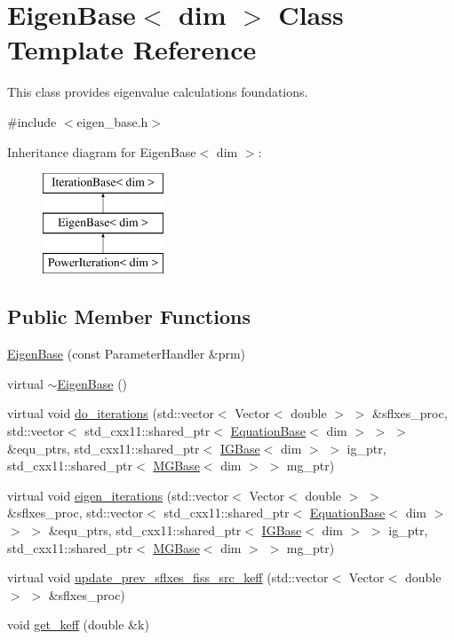 \hypertarget{class_eigen_base}{}\section{Eigen\+Base$<$ dim $>$ Class Template Reference}
\label{class_eigen_base}


This class provides eigenvalue calculations foundations.  




{\ttfamily \#include $<$eigen\+\_\+base.\+h$>$}

Inheritance diagram for Eigen\+Base$<$ dim $>$\+:\begin{figure}[H]
\begin{center}
\leavevmode
\includegraphics[height=3.000000cm]{class_eigen_base}
\end{center}
\end{figure}
\subsection*{Public Member Functions}
\begin{DoxyCompactItemize}
\item 
\hyperlink{class_eigen_base_a041823ed11437980ff73ada87a9717fe}{Eigen\+Base} (const Parameter\+Handler \&prm)
\item 
virtual \hyperlink{class_eigen_base_afe9efbe26f3d5a427caa1d5022555038}{$\sim$\+Eigen\+Base} ()
\item 
virtual void \hyperlink{class_eigen_base_a8a9ef8878e5b7199aa662f2b61b2d864}{do\+\_\+iterations} (std\+::vector$<$ Vector$<$ double $>$ $>$ \&sflxes\+\_\+proc, std\+::vector$<$ std\+\_\+cxx11\+::shared\+\_\+ptr$<$ \hyperlink{class_equation_base}{Equation\+Base}$<$ dim $>$ $>$ $>$ \&equ\+\_\+ptrs, std\+\_\+cxx11\+::shared\+\_\+ptr$<$ \hyperlink{class_i_g_base}{I\+G\+Base}$<$ dim $>$ $>$ ig\+\_\+ptr, std\+\_\+cxx11\+::shared\+\_\+ptr$<$ \hyperlink{class_m_g_base}{M\+G\+Base}$<$ dim $>$ $>$ mg\+\_\+ptr)
\item 
virtual void \hyperlink{class_eigen_base_ae09830ed4bcb14b7b699cd5f5460fab7}{eigen\+\_\+iterations} (std\+::vector$<$ Vector$<$ double $>$ $>$ \&sflxes\+\_\+proc, std\+::vector$<$ std\+\_\+cxx11\+::shared\+\_\+ptr$<$ \hyperlink{class_equation_base}{Equation\+Base}$<$ dim $>$ $>$ $>$ \&equ\+\_\+ptrs, std\+\_\+cxx11\+::shared\+\_\+ptr$<$ \hyperlink{class_i_g_base}{I\+G\+Base}$<$ dim $>$ $>$ ig\+\_\+ptr, std\+\_\+cxx11\+::shared\+\_\+ptr$<$ \hyperlink{class_m_g_base}{M\+G\+Base}$<$ dim $>$ $>$ mg\+\_\+ptr)
\item 
virtual void \hyperlink{class_eigen_base_aa51c202e12e88c70652aefbe4d399f2b}{update\+\_\+prev\+\_\+sflxes\+\_\+fiss\+\_\+src\+\_\+keff} (std\+::vector$<$ Vector$<$ double $>$ $>$ \&sflxes\+\_\+proc)
\item 
void \hyperlink{class_eigen_base_aeb0646a8338d5929cb33d5d7aee49e08}{get\+\_\+keff} (double \&k)
\end{DoxyCompactItemize}
